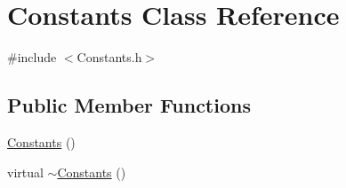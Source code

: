 \hypertarget{classConstants}{}\section{Constants Class Reference}
\label{classConstants}


{\ttfamily \#include $<$Constants.\+h$>$}

\subsection*{Public Member Functions}
\begin{DoxyCompactItemize}
\item 
\hyperlink{classConstants_af395b3c1d6f0577f4880a21a257aa1db}{Constants} ()
\item 
virtual \hyperlink{classConstants_a2dce6c6db3f1ba4114550606fae1765a}{$\sim$\+Constants} ()
\end{DoxyCompactItemize}
